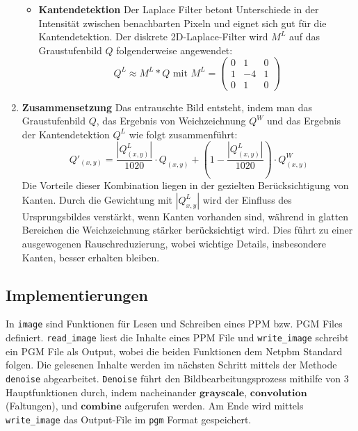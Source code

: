 \documentclass[course=erap]{aspdoc}
\begin{document}
\begin{enumerate}
\begin{itemize}
    \item\textbf{Kantendetektion} \newline
    Der Laplace Filter betont Unterschiede in der Intensität zwischen benachbarten Pixeln und eignet sich gut für die Kantendetektion. Der diskrete 2D-Laplace-Filter wird $M^L$ auf das Graustufenbild $Q$ folgenderweise angewendet:
    \[
        Q^L \approx M^L\ast Q \text{ mit } M^L= \begin{pmatrix}
        0&1&0 \\ 1&-4&1 \\ 0&1&0
        \end{pmatrix}
    \]
\end{itemize}
    \item \textbf{Zusammensetzung} \newline 
    Das entrauschte Bild entsteht, indem man das Graustufenbild $Q$, das Ergebnis von Weichzeichnung $Q^W$ und das Ergebnis der Kantendetektion $Q^L$ wie folgt zusammenführt:
    \[
    Q'_{(x,y)} = \frac{|Q^L_{(x,y)}|}{1020}\cdot Q_{(x,y)}+(1-\frac{|Q^L_{(x,y)}|}{1020})\cdot Q^W_{(x,y)}
    \]  
    Die Vorteile dieser Kombination liegen in der gezielten Berücksichtigung von Kanten. Durch die Gewichtung mit $|Q^L_{x,y}|$ wird der Einfluss des Ursprungsbildes verstärkt, wenn Kanten vorhanden sind, während in glatten Bereichen die Weichzeichnung stärker berücksichtigt wird. Dies führt zu einer ausgewogenen Rauschreduzierung, wobei wichtige Details, insbesondere Kanten, besser erhalten bleiben.
\end{enumerate}
\subsection{Implementierungen}
In \texttt{image} sind Funktionen für Lesen und Schreiben eines PPM bzw. PGM Files definiert. \texttt{read\_image} liest die Inhalte eines PPM File und \texttt{write\_image} schreibt ein PGM File als Output, wobei die beiden Funktionen dem Netpbm Standard folgen. \newline Die gelesenen Inhalte werden im nächsten Schritt mittels der Methode \texttt{denoise} abgearbeitet. \texttt{Denoise} führt den Bildbearbeitungsprozess mithilfe von 3 Hauptfunktionen durch, indem nacheinander $\textbf{grayscale}$, $\textbf{convolution}$ (Faltungen), und $\textbf{combine}$ aufgerufen werden. \newline Am Ende wird mittels \texttt{write\_image} das Output-File im \texttt{pgm} Format gespeichert.
\end{document}
